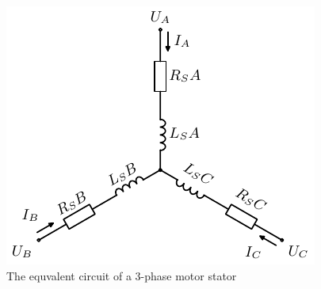 \begin{figure}[htb]
\begingroup
\tikzset{}
 \centerline{\includegraphics[width=.35\columnwidth]{.//Figure/threephase_winding.pdf}}
 \endgroup
 \caption{The equvalent circuit of a 3-phase motor stator}
 \label{fig:threephase_winding}
\end{figure}